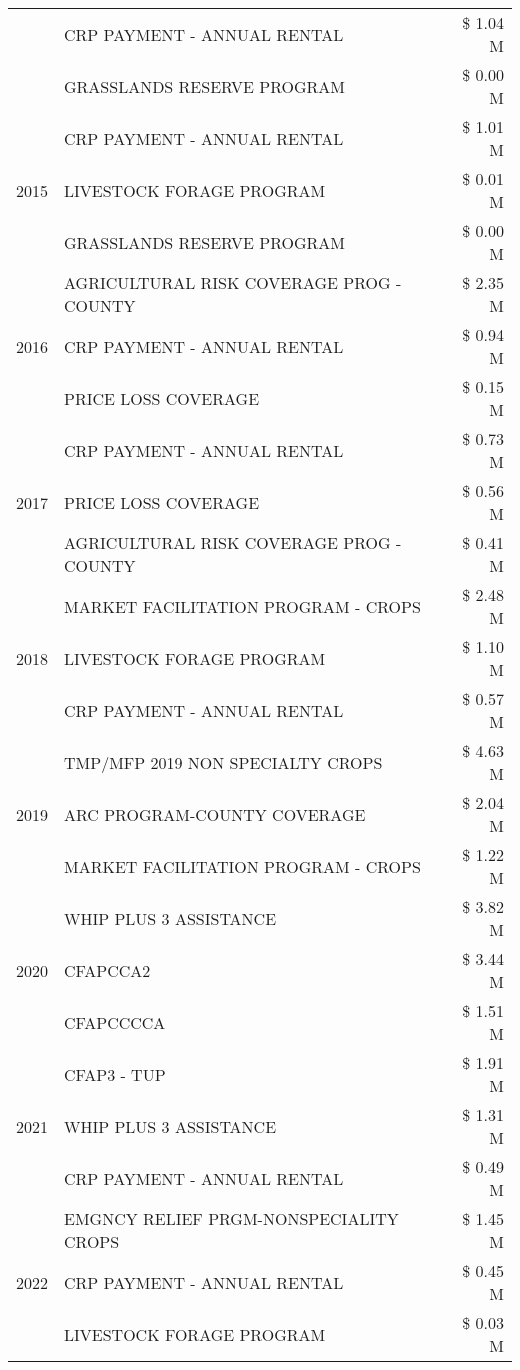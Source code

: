 \begin{tabular}{llr}
 & CRP PAYMENT - ANNUAL RENTAL & \$ 1.04 M \\
 & GRASSLANDS RESERVE PROGRAM & \$ 0.00 M \\
\cline{1-3}
\multirow[t]{3}{*}{2015} & CRP PAYMENT - ANNUAL RENTAL & \$ 1.01 M \\
 & LIVESTOCK FORAGE PROGRAM & \$ 0.01 M \\
 & GRASSLANDS RESERVE PROGRAM & \$ 0.00 M \\
\cline{1-3}
\multirow[t]{3}{*}{2016} & AGRICULTURAL RISK COVERAGE PROG - COUNTY & \$ 2.35 M \\
 & CRP PAYMENT - ANNUAL RENTAL & \$ 0.94 M \\
 & PRICE LOSS COVERAGE & \$ 0.15 M \\
\cline{1-3}
\multirow[t]{3}{*}{2017} & CRP PAYMENT - ANNUAL RENTAL & \$ 0.73 M \\
 & PRICE LOSS COVERAGE & \$ 0.56 M \\
 & AGRICULTURAL RISK COVERAGE PROG - COUNTY & \$ 0.41 M \\
\cline{1-3}
\multirow[t]{3}{*}{2018} & MARKET FACILITATION PROGRAM - CROPS & \$ 2.48 M \\
 & LIVESTOCK FORAGE PROGRAM & \$ 1.10 M \\
 & CRP PAYMENT - ANNUAL RENTAL & \$ 0.57 M \\
\cline{1-3}
\multirow[t]{3}{*}{2019} & TMP/MFP 2019 NON SPECIALTY CROPS & \$ 4.63 M \\
 & ARC PROGRAM-COUNTY COVERAGE & \$ 2.04 M \\
 & MARKET FACILITATION PROGRAM - CROPS & \$ 1.22 M \\
\cline{1-3}
\multirow[t]{3}{*}{2020} & WHIP PLUS 3 ASSISTANCE & \$ 3.82 M \\
 & CFAPCCA2 & \$ 3.44 M \\
 & CFAPCCCCA & \$ 1.51 M \\
\cline{1-3}
\multirow[t]{3}{*}{2021} & CFAP3 - TUP & \$ 1.91 M \\
 & WHIP PLUS 3 ASSISTANCE & \$ 1.31 M \\
 & CRP PAYMENT - ANNUAL RENTAL & \$ 0.49 M \\
\cline{1-3}
\multirow[t]{3}{*}{2022} & EMGNCY RELIEF PRGM-NONSPECIALITY CROPS & \$ 1.45 M \\
 & CRP PAYMENT - ANNUAL RENTAL & \$ 0.45 M \\
 & LIVESTOCK FORAGE PROGRAM & \$ 0.03 M \\
\cline{1-3}
\bottomrule
\end{tabular}
